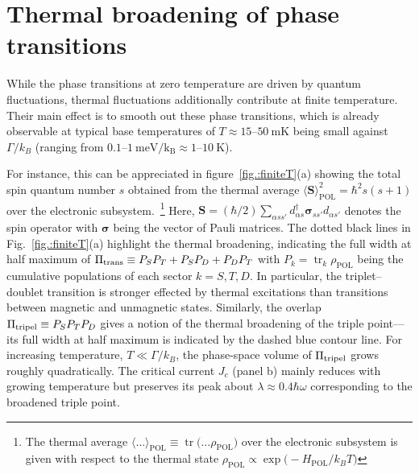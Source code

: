\documentclass[aps,prb,twocolumn,superscriptaddress,amsmath,amssymb,longbibliography]{revtex4-1}
\newcommand{\ev}[1]{\ensuremath{\langle #1 \rangle}}
\newcommand{\tr}{\ensuremath{\operatorname{tr}}}
\begin{document}
	\section{\label{sec.:thermalBroadening}Thermal broadening of phase transitions}
	While the phase transitions at zero temperature are driven by quantum fluctuations, thermal fluctuations additionally contribute at finite temperature. 
	Their main effect is to smooth out these phase transitions, which is already observable at typical base temperatures of $T\approx 15$--$50\ \mathrm{mK}$
	being small against $\Gamma/k_B$ (ranging from $0.1$--$1\ \mathrm{meV/k_B}\approx 1$--$10\ \mathrm{K}$).~\cite{JorgensenNanoL2007a,DelagrangePRB2016a,EstradaSaldanaPRL2018a}
	
	For instance, this can be appreciated in figure~\ref{fig.:finiteT}(a) showing the total spin quantum number 
	$s$ obtained from the thermal average $\ev{\bm{S}}_{\textrm{POL}}^2=\hbar^2 s (s+1)$ over the electronic subsystem.~\footnote{
	The thermal average $\ev{\ldots}_{\textrm{POL}}\equiv \tr\big(\ldots\rho_{\textrm{POL}} \big)$ over the electronic subsystem is given
	with respect to the thermal state $\rho_{\textrm{POL}}\propto\exp\big(-H_{\textrm{POL}}/k_BT\big)$
	}  Here, $\bm{S}=(\hbar/2)\sum_{\alpha ss'} d_{\alpha s}^\dag \bm{\sigma}_{ss'} d_{\alpha s'}$ denotes the spin operator with $\bm{\sigma}$ 
	being the vector of Pauli matrices. The dotted black lines in Fig.~\ref{fig.:finiteT}(a)  highlight the thermal broadening, indicating the full width at half maximum of  
	$\Pi_{\rm trans}\equiv P_S P_T+P_S P_D+P_D P_T$ with $P_k=\tr_k\rho_{\textrm{POL}}$ being the cumulative populations of each sector $k=S,T,D$.
	In particular, the triplet--doublet transition is stronger effected by thermal excitations than transitions between magnetic and unmagnetic states. Similarly, 
	the overlap $\Pi_{\rm tripel}\equiv P_S P_T P_D$ gives a notion of the thermal broadening of the triple point---its full width at half maximum is indicated 
	by the dashed blue contour line. For increasing temperature, $T\ll\Gamma/k_B$, the phase-space volume of $\Pi_{\rm tripel}$ grows roughly quadratically.
	The critical current $J_c$ (panel b) mainly reduces with growing temperature but preserves its peak about $\lambda\approx0.4\hbar\omega$ 
	corresponding to the broadened triple point. 
	
\end{document}
